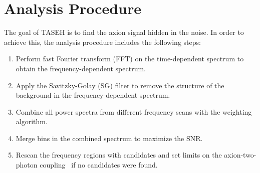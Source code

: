 \section{Analysis Procedure} \label{sec:ana}
The goal of TASEH is to find the axion signal hidden in the noise. In 
order to achieve this, the analysis procedure includes the following steps:
    \begin{enumerate}
        \item Perform fast Fourier transform (FFT) on the 
time-dependent spectrum to obtain the frequency-dependent spectrum.
        \item Apply the Savitzky-Golay (SG) filter to remove the structure of the background in the frequency-dependent spectrum.
        \item Combine all power spectra from different frequency scans with 
the weighting algorithm.
        \item Merge bins in the combined spectrum to maximize the SNR. 
       \item Rescan the frequency regions with candidates and set limits on 
      the axion-two-photon coupling \gagg\ if no candidates were found.
    \end{enumerate}

